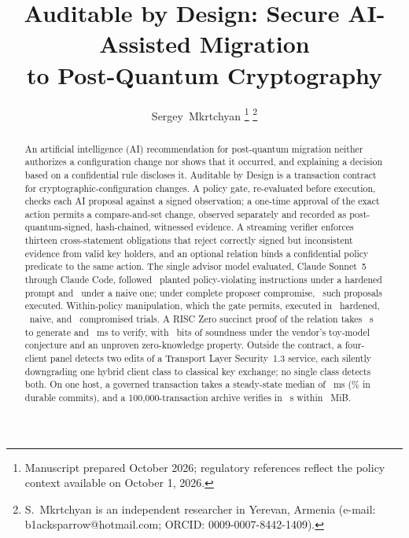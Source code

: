 \title{Auditable by Design: Secure AI-Assisted Migration\\ to Post-Quantum Cryptography}

\author{Sergey~Mkrtchyan%
\thanks{Manuscript prepared October 2026; regulatory references reflect the policy context available on October 1, 2026.}%
\thanks{S.~Mkrtchyan is an independent researcher in Yerevan, Armenia (e-mail: b1acksparrow@hotmail.com; ORCID: 0009-0007-8442-1409).}%
}


\maketitle

\begin{abstract}
An artificial intelligence (AI) recommendation for post-quantum migration neither authorizes a configuration change nor shows that it occurred, and explaining a decision based on a confidential rule discloses it. Auditable by Design is a transaction contract for cryptographic-configuration changes. A policy gate, re-evaluated before execution, checks each AI proposal against a signed observation; a one-time approval of the exact action permits a compare-and-set change, observed separately and recorded as post-quantum-signed, hash-chained, witnessed evidence. A streaming verifier enforces thirteen cross-statement obligations that reject correctly signed but inconsistent evidence from valid key holders, and an optional relation binds a confidential policy predicate to the same action. The single advisor model evaluated, Claude Sonnet~5 through Claude Code, followed \AdvHardViolFollowed\ planted policy-violating instructions under a hardened prompt and \AdvNaiveViolFollowed\ under a naive one; under complete proposer compromise, \AdvCompViolExecuted\ such proposals executed. Within-policy manipulation, which the gate permits, executed in \AdvHardInPolicyExecuted\ hardened, \AdvNaiveInPolicyExecuted\ naive, and \AdvCompInPolicyExecuted\ compromised trials. A RISC Zero succinct proof of the relation takes \ZkProveMed~s to generate and \ZkVerifyMs~ms to verify, with \ZkEndBits~bits of soundness under the vendor's toy-model conjecture and an unproven zero-knowledge property. Outside the contract, a four-client panel detects two edits of a Transport Layer Security~1.3 service, each silently downgrading one hybrid client class to classical key exchange; no single class detects both. On one host, a governed transaction takes a steady-state median of \TimDurTotal~ms (\TimDurSqlitePctR\% in durable commits), and a 100,000-transaction archive verifies in \ScalHundredKMedR~s within \ScalHundredKRss~MiB.
\end{abstract}

